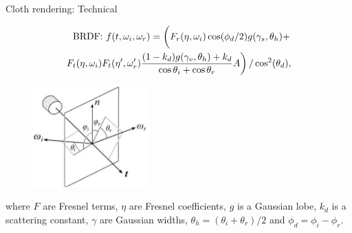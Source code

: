 \documentclass{beamer}
\begin{document}
\begin{frame}{Cloth rendering: Technical}

\begin{equation*} 
\begin{split}
\mbox{BRDF: } f(t, \omega_i, \omega_r) = \left( \vphantom{\int} F_r(\eta, \omega_i) \cos(\phi_d/2)g(\gamma_s, \theta_h) + \right. \\ 
 \left. F_t(\eta, \omega_i) F_t(\eta', \omega_r') \frac{(1-k_d)g(\gamma_v, \theta_h)+k_d}{\cos \theta_i + \cos \theta_r} A \right) / \cos^2(\theta_d),
\end{split}
\end{equation*}

\begin{multicols}{2}
\begin{figure}[b!]
\includegraphics[width=0.4\textwidth]{img/cloth_directions}
\end{figure}

\vfill
\columnbreak
\vspace*{\fill}
\small{where $F$ are Fresnel terms, $\eta$ are Fresnel coefficients, $g$ is a Gaussian lobe, $k_d$ is a scattering constant, $\gamma$ are Gaussian widths, $\theta_h = (\theta_i+\theta_r)/2$ and $\phi_d = \phi_i-\phi_r$. }
\end{multicols}

\end{frame}
\end{document}
